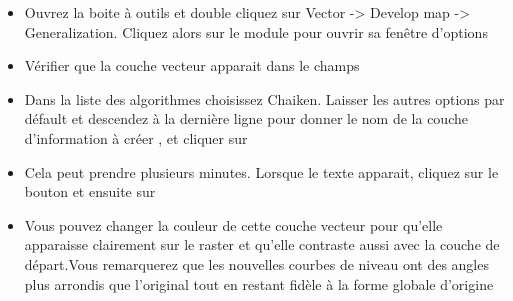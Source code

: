 \begin{itemize}[label=--]
\item Ouvrez la boite à outils \grass et double cliquez sur Vector -> Develop map -> Generalization. Cliquez alors sur le module  pour ouvrir sa fenêtre d'options
\item Vérifier que la couche vecteur  apparait dans le champs\\ 
\item Dans la liste des algorithmes choisissez Chaiken. Laisser les autres options par défault et descendez à la dernière ligne pour donner le nom de la couche d'information à créer  , et cliquer sur 
\item Cela peut prendre plusieurs minutes. Lorsque le texte  apparait, cliquez sur le bouton  et ensuite sur 
\item Vous pouvez changer la couleur de cette couche vecteur pour qu'elle apparaisse clairement sur le raster et qu'elle contraste aussi avec la couche de départ.Vous remarquerez que les nouvelles courbes de niveau ont des angles plus arrondis que l'original tout en restant fidèle à la forme globale d'origine
\end{itemize}

